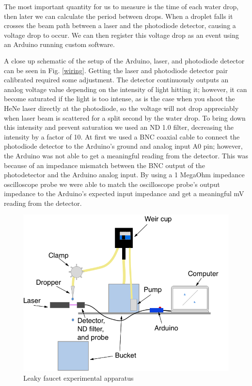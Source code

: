 \documentclass[11pt]{article}
\begin{document}
The most important quantity for us to measure is the time of each water drop, then later we can calculate the period between drops. When a droplet falls it crosses the beam path between a laser and the photodiode detector, causing a voltage drop to occur. We can then register this voltage drop as an event using an Arduino running custom software. 

A close up schematic of the setup of the Arduino, laser, and photodiode detector can be seen in Fig. \ref{wiring}. Getting the laser and photodiode detector pair calibrated required some adjustment. The detector continuously outputs an analog voltage value depending on the intensity of light hitting it; however, it can become saturated if the light is too intense, as is the case when you shoot the HeNe laser directly at the photodiode, so the voltage will not drop appreciably when laser beam is scattered for a split second by the water drop. To bring down this intensity and prevent saturation we used an ND 1.0 filter, decreasing the intensity by a factor of 10. At first we used a BNC coaxial cable to connect the photodiode detector to the Arduino's ground and analog input A0 pin; however, the Arduino was not able to get a meaningful reading from the detector. This was because of an impedance mismatch between the BNC output of the photodetector and the Arduino analog input. By using a 1 MegaOhm impedance oscilloscope probe we were able to match the oscilloscope probe's output impedance to the Arduino's expected input impedance and get a meaningful mV reading from the detector.

\newpage
\begin{figure}[htp]
\begin{center}
\includegraphics[width=4.7in]{figs/apparatus}
\caption{Leaky faucet experimental apparatus}
\label{apparatus}
\end{center}
\end{figure}
\end{document}
